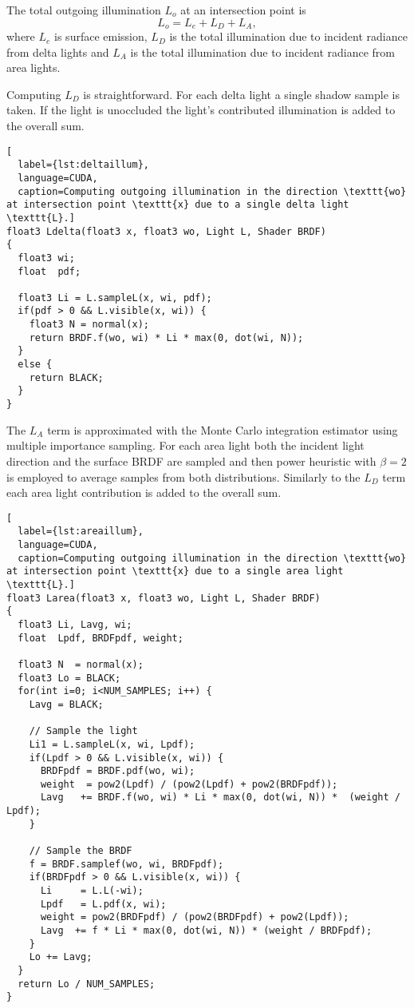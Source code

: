 The total outgoing illumination $L_{o}$ at an intersection point is
\begin{equation}
  L_{o} = L_{e} + L_{D} + L_{A},
\end{equation}
where $L_{e}$ is surface emission, $L_{D}$ is the total illumination due to incident radiance from delta lights and $L_{A}$ is the total illumination due to incident radiance from area lights.

Computing $L_{D}$ is straightforward. For each delta light a single shadow sample is taken. If the light is unoccluded the light's contributed illumination is added to the overall sum.

\begin{lstlisting}[
  label={lst:deltaillum},
  language=CUDA,
  caption=Computing outgoing illumination in the direction \texttt{wo} at intersection point \texttt{x} due to a single delta light \texttt{L}.]
float3 Ldelta(float3 x, float3 wo, Light L, Shader BRDF)
{
  float3 wi;
  float  pdf;

  float3 Li = L.sampleL(x, wi, pdf);
  if(pdf > 0 && L.visible(x, wi)) {
    float3 N = normal(x);
    return BRDF.f(wo, wi) * Li * max(0, dot(wi, N));
  }
  else {
    return BLACK;
  }
}
\end{lstlisting}

The $L_{A}$ term is approximated with the Monte Carlo integration estimator using multiple importance sampling. For each area light both the incident light direction and the surface BRDF are sampled and then power heuristic with $\beta=2$ is employed to average samples from both distributions. Similarly to the $L_{D}$ term each area light contribution is added to the overall sum.

\begin{lstlisting}[
  label={lst:areaillum},
  language=CUDA,
  caption=Computing outgoing illumination in the direction \texttt{wo} at intersection point \texttt{x} due to a single area light \texttt{L}.]
float3 Larea(float3 x, float3 wo, Light L, Shader BRDF)
{
  float3 Li, Lavg, wi;
  float  Lpdf, BRDFpdf, weight;

  float3 N  = normal(x);
  float3 Lo = BLACK;
  for(int i=0; i<NUM_SAMPLES; i++) {
    Lavg = BLACK;

    // Sample the light
    Li1 = L.sampleL(x, wi, Lpdf);
    if(Lpdf > 0 && L.visible(x, wi)) {
      BRDFpdf = BRDF.pdf(wo, wi);
      weight  = pow2(Lpdf) / (pow2(Lpdf) + pow2(BRDFpdf));
      Lavg   += BRDF.f(wo, wi) * Li * max(0, dot(wi, N)) *  (weight / Lpdf);
    }

    // Sample the BRDF
    f = BRDF.samplef(wo, wi, BRDFpdf);
    if(BRDFpdf > 0 && L.visible(x, wi)) {
      Li     = L.L(-wi);
      Lpdf   = L.pdf(x, wi);
      weight = pow2(BRDFpdf) / (pow2(BRDFpdf) + pow2(Lpdf));
      Lavg  += f * Li * max(0, dot(wi, N)) * (weight / BRDFpdf);
    }
    Lo += Lavg;
  }
  return Lo / NUM_SAMPLES;
}
\end{lstlisting}

